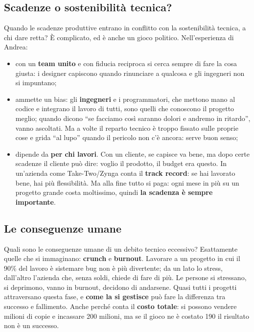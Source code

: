 \subsection{Scadenze o sostenibilità tecnica?}

Quando le scadenze produttive entrano in conflitto con la sostenibilità tecnica, a
chi dare retta? È complicato, ed è anche un gioco politico. Nell'esperienza di
Andrea:
\begin{itemize}
  \item con un \textbf{team unito} e con fiducia reciproca si cerca sempre di fare
        la cosa giusta: i designer capiscono quando rinunciare a qualcosa e gli
        ingegneri non si impuntano;
  \item ammette un bias: gli \textbf{ingegneri} e i programmatori, che mettono
        mano al codice e integrano il lavoro di tutti, sono quelli che conoscono il
        progetto meglio; quando dicono ``se facciamo così saranno dolori e andremo
        in ritardo'', vanno ascoltati. Ma a volte il reparto tecnico è troppo
        fissato sulle proprie cose e grida ``al lupo'' quando il pericolo non c'è
        ancora: serve buon senso;
  \item dipende da \textbf{per chi lavori}. Con un cliente, se capisce va bene, ma
        dopo certe scadenze il cliente può dire: voglio il prodotto, il budget era
        questo. In un'azienda come Take-Two/Zynga conta il \textbf{track record}:
        se hai lavorato bene, hai più flessibilità. Ma alla fine tutto si paga: ogni
        mese in più su un progetto grande costa moltissimo, quindi \textbf{la
        scadenza è sempre importante}.
\end{itemize}

\subsection{Le conseguenze umane}

Quali sono le conseguenze umane di un debito tecnico eccessivo? Esattamente quelle
che si immaginano: \textbf{crunch} e \textbf{burnout}. Lavorare a un progetto in cui
il 90\% del lavoro è sistemare bug non è più divertente; da un lato lo stress,
dall'altro l'azienda che, senza soldi, chiede di fare di più. Le persone si
stressano, si deprimono, vanno in burnout, decidono di andarsene. Quasi tutti i
progetti attraversano questa fase, e \textbf{come la si gestisce} può fare la
differenza tra successo e fallimento. Anche perché conta il \textbf{costo totale}:
si possono vendere milioni di copie e incassare 200 milioni, ma se il gioco ne è
costato 190 il risultato non è un successo.

